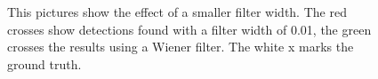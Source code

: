 \begin{figure}
\hfill
{}
	\caption{This pictures show the effect of a smaller filter width. The red crosses show detections found with a filter width of 0.01, the green crosses the results using a Wiener filter. The white x marks the ground truth.}
	\label{betterthansimplestorm}	
\end{figure}

